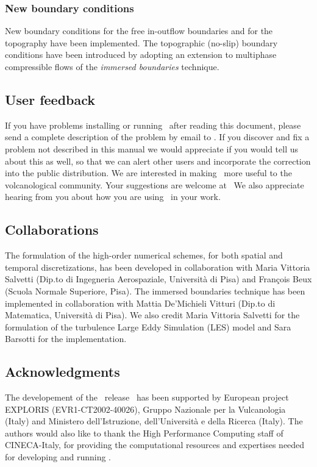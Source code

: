 \subsubsection*{New boundary conditions}
New boundary conditions for the free in-outflow boundaries and for the
topography have been implemented. The topographic (no-slip) boundary
conditions have been introduced by adopting an extension to multiphase
compressible flows of the {\em immersed boundaries} technique.

\subsection{User feedback}

If you have problems installing or running \PDAC\ after
reading this document, please send a
complete description of the problem by email to \PDACADDRESS.
If you discover and fix a problem not described in this manual we would
appreciate if you would tell us about this as well, so that we can alert
other users and incorporate the correction into the public distribution.
\prettypar
We are interested in making \PDAC\ more useful to the volcanological
community.  Your suggestions are welcome at \PDACADDRESS\ 
We also appreciate hearing from you about how you are using \PDAC\ 
in your work.


\subsection{Collaborations}
The formulation of the high-order numerical schemes, for both spatial
and temporal discretizations, has been developed in collaboration with
Maria Vittoria Salvetti (Dip.to di Ingegneria Aerospaziale, Universit\`a 
di Pisa) and Fran\c{c}ois Beux (Scuola Normale Superiore, Pisa). The 
immersed boundaries technique has been implemented in collaboration with
Mattia De'Michieli Vitturi (Dip.to di Matematica, Universit\`a di Pisa). 
We also credit Maria Vittoria Salvetti for the formulation of the turbulence 
Large Eddy Simulation (LES) model and Sara Barsotti for the implementation.

\subsection{Acknowledgments}

The developement of the \PDAC\ release \PDACVERSION\ has been supported 
by European project EXPLORIS (EVR1-CT2002-40026), Gruppo Nazionale per
la Vulcanologia (Italy) and Ministero dell'Istruzione, dell'Universit\`a 
e della Ricerca (Italy).
\prettypar
The authors would also like to thank the High Performance Computing
staff of CINECA-Italy, for providing the computational resources and expertises
needed for developing and running \PDAC.
\prettypar
